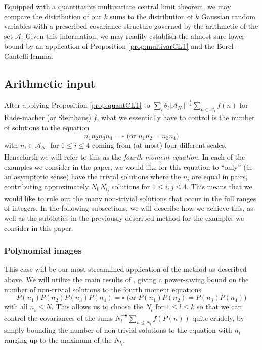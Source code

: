 \documentclass[11pt]{tran-l}
\theoremstyle{definition}
\theoremstyle{remark}
\numberwithin{equation}{section}
\begin{document}
Equipped with a quantitative multivariate central limit theorem, we may compare the distribution of our $k$ sums to the distribution of $k$ Gaussian random variables with a prescribed covariance structure governed by the arithmetic of the set $\mathcal A$. Given this information, we may readily establish the almost sure lower bound by an application of Proposition \ref{prop:multivarCLT} and the Borel-Cantelli lemma. 

\subsection{Arithmetic input} After applying Proposition \ref{prop:quantCLT} to $\sum_l\theta_l\lvert \mathcal A_{N_l}\rvert^{-\frac{1}{2}}\sum_{n\in\mathcal A_l}f(n)$ for Rade-macher (or Steinhaus) $f$, what we essentially have to control is the number of solutions to the equation $$n_1n_2n_3n_4=\square \text{ (or } n_1n_2=n_3n_4\text{)}$$ with $n_i\in\mathcal A_{N_{l_i}}$ for $1\leq i\leq 4$ coming from (at most) four different scales. Henceforth we will refer to this as the \emph{fourth moment equation}. 
In each of the examples we consider in the paper, we would like for this equation to ``only'' (in an asymptotic sense) have the trivial solutions where the $n_i$ are equal in pairs, contributing approximately $N_{l_i}N_{l_j}$ solutions for $1\leq i, j\leq 4$. This means that we would like to rule out the many non-trivial solutions that occur in the full ranges of integers. In the following subsections, we will describe how we achieve this, as well as the subtleties in the previously described method for the examples we consider in this paper. 

\subsubsection{Polynomial images} This case will be our most streamlined application of the method as described above. 
We will utilize the main results of \cite{KlurmanShkredovXu2023, ChinisShala2025}, giving a power-saving bound on the number of non-trivial solutions to the fourth moment equations  $$P(n_1)P(n_2)P(n_3)P(n_4) = \square \text{ (or  } P(n_1)P(n_2) = P(n_3)P(n_4)\text{)}$$ with all $n_i\leq N$. This allows us to choose the $N_l$ for $1\leq l\leq k$ so that we can control the covariances of the sums $N_l^{-\frac{1}{2}}\sum_{n\leq N_l} f(P(n))$ quite crudely, by simply bounding the number of non-trivial solutions to the equation with $n_i$ ranging up to the maximum of the $N_{l_i}$. 
\end{document}

